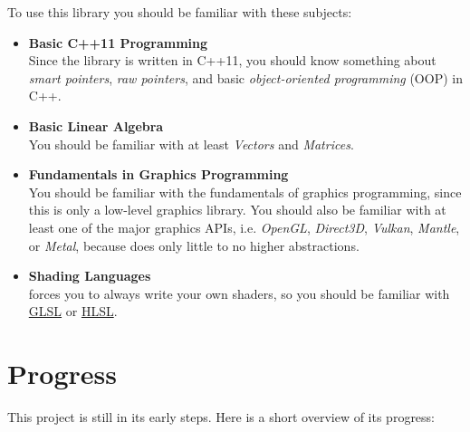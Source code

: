 \documentclass{article}
\begin{document}
To use this library you should be familiar with these subjects:
\begin{itemize}
	\item \textbf{Basic C++11 Programming} \\
	Since the library is written in C++11, you should know something about \emph{smart pointers},
	\emph{raw pointers}, and basic \emph{object-oriented programming} (OOP) in C++.
	
	\item \textbf{Basic Linear Algebra} \\
	You should be familiar with at least \emph{Vectors} and \emph{Matrices}.
	
	\item \textbf{Fundamentals in Graphics Programming} \\
	You should be familiar with the fundamentals of graphics programming, since this is only a low-level graphics library.
	You should also be familiar with at least one of the major graphics APIs,
	i.e. \emph{OpenGL}, \emph{Direct3D}, \emph{Vulkan}, \emph{Mantle}, or \emph{Metal},
	because \LLGL does only little to no higher abstractions.
	
	\item \textbf{Shading Languages} \\
	\LLGL forces you to always write your own shaders, so you should be familiar with
	\href{https://www.opengl.org/documentation/glsl/}{GLSL} or
	\href{https://msdn.microsoft.com/de-de/library/windows/desktop/bb509561(v=vs.85).aspx}{HLSL}.
\end{itemize}



\newpage
\section*{Progress}

This project is still in its early steps. Here is a short overview of its progress:
\end{document}

